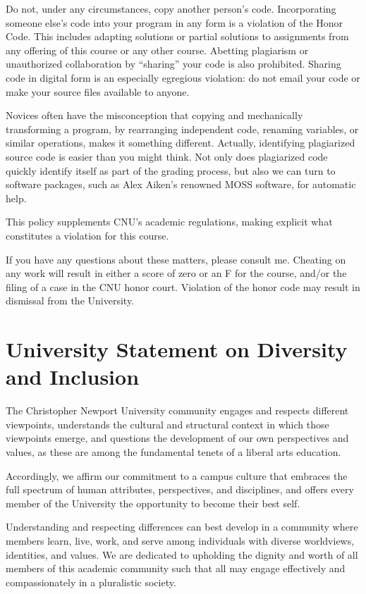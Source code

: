 \documentclass[11pt]{article}
\begin{document}
Do not, under any circumstances, copy another person's code. Incorporating someone else's code into your program in any form is a violation of the Honor Code. This includes adapting solutions or partial solutions to assignments from any offering of this course or any other course. Abetting plagiarism or unauthorized collaboration by ``sharing'' your code is also prohibited. Sharing code in digital form is an especially egregious violation: do not email your code or make your source files available to anyone.

Novices often have the misconception that copying and mechanically transforming a program, by rearranging independent code, renaming variables, or similar operations, makes it something different. Actually, identifying plagiarized source code is easier than you might think. Not only does plagiarized code quickly identify itself as part of the grading process, but also we can turn to software packages, such as Alex Aiken's renowned MOSS software, for automatic help.

This policy supplements CNU's academic regulations, making explicit what constitutes a violation for this course.

If you have any questions about these matters, please consult me. Cheating on any work will result in either a score of zero or an F for the course, and/or the filing of a case in the CNU honor court. Violation of the honor code may result in dismissal from the University.

\section{University Statement on Diversity and Inclusion}

The Christopher Newport University community engages and respects different viewpoints, understands the cultural and structural context in which those viewpoints emerge, and questions the development of our own perspectives and values, as these are among the fundamental tenets of a liberal arts education.

Accordingly, we affirm our commitment to a campus culture that embraces the full spectrum of human attributes, perspectives, and disciplines, and offers every member of the University the opportunity to become their best self.

Understanding and respecting differences can best develop in a community where members learn, live, work, and serve among individuals with diverse worldviews, identities, and values. We are dedicated to upholding the dignity and worth of all members of this academic community such that all may engage effectively and compassionately in a pluralistic society.
\end{document}
